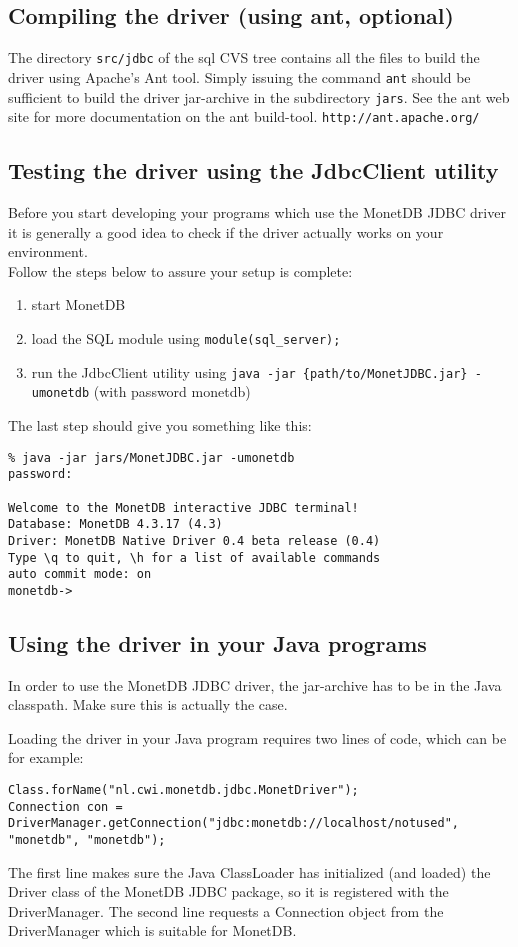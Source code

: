 \documentclass{article}
\begin{document}
\subsection{Compiling the driver (using ant, optional)}
The directory \texttt{src/jdbc} of the sql CVS tree contains all the files to build the driver using
Apache's Ant tool. Simply issuing the command \texttt{ant} should be sufficient to build the driver
jar-archive in the subdirectory \texttt{jars}. See the ant web site for more documentation on the
ant build-tool. \texttt{http://ant.apache.org/}

\subsection{Testing the driver using the JdbcClient utility}
Before you start developing your programs which use the MonetDB JDBC driver it is generally
a good idea to check if the driver actually works on your environment.\\
Follow the steps below to assure your setup is complete:
\begin{enumerate}
\item start MonetDB
\item load the SQL module using \texttt{module(sql\_server);}
\item run the JdbcClient utility using \texttt{java -jar \{path/to/MonetJDBC.jar\} -umonetdb} (with
 password monetdb)
\end{enumerate}
The last step should give you something like this:
\begin{verbatim}
% java -jar jars/MonetJDBC.jar -umonetdb
password:

Welcome to the MonetDB interactive JDBC terminal!
Database: MonetDB 4.3.17 (4.3)
Driver: MonetDB Native Driver 0.4 beta release (0.4)
Type \q to quit, \h for a list of available commands
auto commit mode: on
monetdb->
\end{verbatim}

\subsection{Using the driver in your Java programs}
In order to use the MonetDB JDBC driver, the jar-archive has to be in the Java classpath.
Make sure this is actually the case.

Loading the driver in your Java program requires two lines of code, which can be for example:
\begin{verbatim}
Class.forName("nl.cwi.monetdb.jdbc.MonetDriver");
Connection con = DriverManager.getConnection("jdbc:monetdb://localhost/notused", "monetdb", "monetdb");
\end{verbatim}
The first line makes sure the Java ClassLoader has initialized (and loaded) the Driver class of the MonetDB
JDBC package, so it is registered with the DriverManager. The second line requests a Connection
object from the DriverManager which is suitable for MonetDB.
\end{document}
